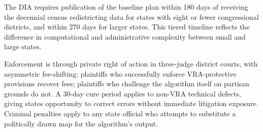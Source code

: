 The DIA requires publication of the baseline plan within 180 days of receiving the decennial census redistricting data for states with eight or fewer congressional districts, and within 270 days for larger states. This tiered timeline reflects the difference in computational and administrative complexity between small and large states.

Enforcement is through private right of action in three-judge district courts, with asymmetric fee-shifting: plaintiffs who successfully enforce VRA-protective provisions recover fees; plaintiffs who challenge the algorithm itself on partisan grounds do not. A 30-day cure period applies to non-VRA technical defects, giving states opportunity to correct errors without immediate litigation exposure. Criminal penalties apply to any state official who attempts to substitute a politically drawn map for the algorithm's output.
